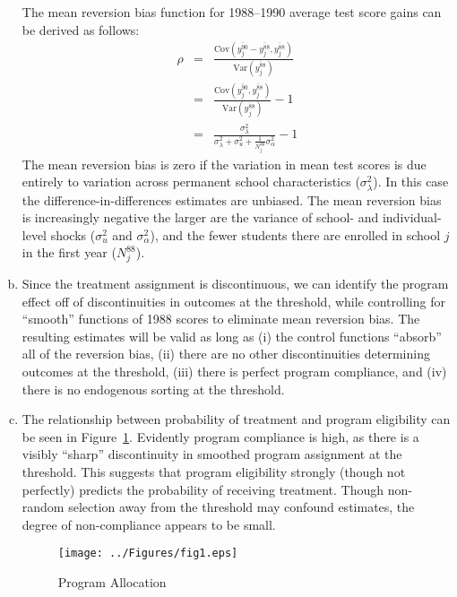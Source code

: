 \documentclass{article}
\begin{document}
\begin{enumerate}[(a)]
The mean reversion bias function for 1988--1990 average test score gains can be derived as follows:
\begin{eqnarray}
\label{eq:mrbf}
\rho &= &\frac{\text{Cov}\left(\overline{y_{j}^{90}}-\overline{y_{j}^{88}},\overline{y_{j}^{88}}\right)}{\text{Var}\left(\overline{y_{j}^{88}}\right)} \nonumber \\
& = &\frac{\text{Cov}\left(\overline{y_{j}^{90}},\overline{y_{j}^{88}}\right)}{\text{Var}\left(\overline{y_{j}^{88}}\right)}-1 \nonumber \\
& = &\frac{\sigma_{\lambda}^{2}}{\sigma_{\lambda}^{2}+\sigma_{u}^{2}+\frac{1}{N_{j}^{88}}\sigma_{\alpha}^{2}}-1
\end{eqnarray}
The mean reversion bias is zero if the variation in mean test scores is due entirely to variation across permanent school characteristics ($\sigma_{\lambda}^{2}$). In this case the difference-in-differences estimates are unbiased. The mean reversion bias is increasingly negative the larger are the variance of school- and individual-level shocks ($\sigma_{u}^{2}$ and $\sigma_{\alpha}^{2}$), and the fewer students there are enrolled in school $j$ in the first year ($N_{j}^{88}$).

\item Since the treatment assignment is discontinuous, we can  identify the program effect off of discontinuities in outcomes at the threshold, while controlling for ``smooth'' functions of 1988 scores to eliminate mean reversion bias. The resulting estimates will be valid as long as (i) the control functions ``absorb'' all of the reversion bias, (ii) there are no other discontinuities determining outcomes at the threshold, (iii) there is perfect program compliance, and (iv) there is no endogenous sorting at the threshold.

\item The relationship between probability of treatment and program eligibility can be seen in Figure~\ref{fig:ptreat}. Evidently program compliance is high, as there is a visibly ``sharp'' discontinuity in smoothed program assignment at the threshold. This suggests that program eligibility strongly (though not perfectly) predicts the probability of receiving treatment. Though non-random selection away from the threshold may confound estimates, the degree of non-compliance appears to be small.

\begin{figure}[htb!]
\centering
\texttt{[image: ../Figures/fig1.eps]}
\caption{Program Allocation}
\label{fig:ptreat}
\end{figure}


\end{enumerate}
\end{document}
